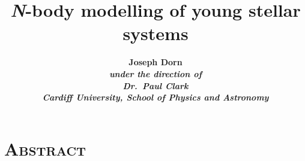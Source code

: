 \title{\vspace*{-1em}\huge\textbf{
    {\slshape N}-body modelling of young stellar systems
    }\vspace{-0.7em}}

\author{\bfseries Joseph Dorn\\ [0.5ex]
    \small\slshape under the direction of\\
    \small Dr.\ Paul Clark
    \vspace{0.7em}\\
    {\small Cardiff University, School of Physics and Astronomy\/}
    \vspace{-2em}}

\date{ }

\maketitle\vspace*{-2em}
\noindent
\hrulefill{}
\vspace*{-1.5em}
\section*{\centering\scshape\large Abstract}
\vspace*{-1em}
\noindent


\noindent
\hrulefill{}

\vspace*{\fill}

\begingroup
    \hypersetup{linkcolor=black}
    \tableofcontents
\endgroup

\thispagestyle{empty} %
\clearpage\setcounter{page}{1} %

